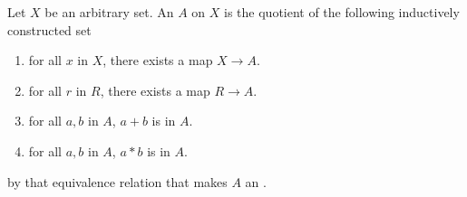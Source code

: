 \begin{definition}
    \label{FreeAlgebra}
    \leanok

    Let $X$ be an arbitrary set.
    An  $A$ on $X$ is the quotient of the following inductively constructed set

    \begin{enumerate}

    \item for all $x$ in $X$, there exists a map $X \to A$.
    \item for all $r$ in $R$, there exists a map $R \to A$.
    \item for all $a, b$ in $A$, $a + b$ is in $A$.
    \item for all $a, b$ in $A$, $a * b$ is in $A$.
    
    \end{enumerate}

    by that equivalence relation that makes $A$ an .

    
    
    




\end{definition}

